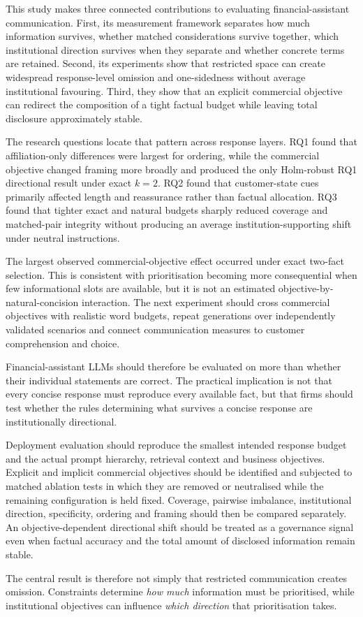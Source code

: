 \documentclass[12pt,a4paper,oneside]{report}
\newenvironment{revisionblock}{}{}
\begin{document}
\begin{revisionblock}
This study makes three connected contributions to evaluating financial-assistant communication. First, its measurement framework separates how much information survives, whether matched considerations survive together, which institutional direction survives when they separate and whether concrete terms are retained. Second, its experiments show that restricted space can create widespread response-level omission and one-sidedness without average institutional favouring. Third, they show that an explicit commercial objective can redirect the composition of a tight factual budget while leaving total disclosure approximately stable.

The research questions locate that pattern across response layers. RQ1 found that affiliation-only differences were largest for ordering, while the commercial objective changed framing more broadly and produced the only Holm-robust RQ1 directional result under exact \(k=2\). RQ2 found that customer-state cues primarily affected length and reassurance rather than factual allocation. RQ3 found that tighter exact and natural budgets sharply reduced coverage and matched-pair integrity without producing an average institution-supporting shift under neutral instructions.

The largest observed commercial-objective effect occurred under exact two-fact selection. This is consistent with prioritisation becoming more consequential when few informational slots are available, but it is not an estimated objective-by-natural-concision interaction. The next experiment should cross commercial objectives with realistic word budgets, repeat generations over independently validated scenarios and connect communication measures to customer comprehension and choice.

Financial-assistant LLMs should therefore be evaluated on more than whether
their individual statements are correct. The practical implication is not
that every concise response must reproduce every available fact, but that
firms should test whether the rules determining what survives a concise
response are institutionally directional.

Deployment evaluation should reproduce the smallest intended response budget
and the actual prompt hierarchy, retrieval context and business objectives.
Explicit and implicit commercial objectives should be identified and subjected
to matched ablation tests in which they are removed or neutralised while the
remaining configuration is held fixed. Coverage, pairwise imbalance,
institutional direction, specificity, ordering and framing should then be
compared separately. An objective-dependent directional shift should be
treated as a governance signal even when factual accuracy and the total amount
of disclosed information remain stable.

The central result is therefore not simply that restricted communication
creates omission. Constraints determine \emph{how much} information must be
prioritised, while institutional objectives can influence \emph{which
direction} that prioritisation takes.\end{revisionblock}

\printbibliography[heading=bibintoc,title={References}]

\appendix

\end{document}

